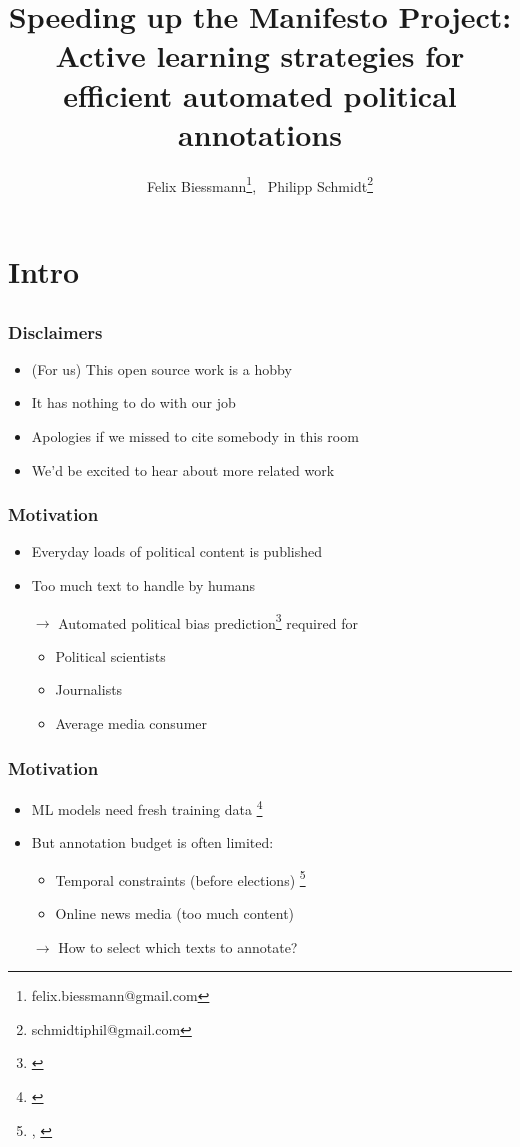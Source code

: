 \documentclass[]{beamer}
\institute[]{}
\title[Active Manifesto]{
{
Speeding up the Manifesto Project: \\ Active learning strategies for \\efficient automated political annotations
}}
\author{
Felix Biessmann\thanks{felix.biessmann@gmail.com},~ 
Philipp Schmidt\thanks{schmidtiphil@gmail.com}
}
\date{}
\begin{document}
\begin{frame} 
\titlepage 
\end{frame}	

%
\section{Intro}
\subsection{}

\begin{frame}\frametitle{Disclaimers}
\small
\begin{itemize}
\item (For us) This open source work is a hobby
\item It has nothing to do with our job
\item Apologies if we missed to cite somebody in this room
\item We'd be excited to hear about more related work
\end{itemize}
\end{frame}

\begin{frame}\frametitle{Motivation}
\begin{itemize}[<+->]
\item Everyday loads of political content is published
\item Too much text to handle by humans
\item[$\rightarrow$] Automated political bias prediction\footnote{\cite{Biessmann16, Merz2016}} required for 
\begin{itemize}
\item Political scientists
\item Journalists
\item Average media consumer
\end{itemize}
\end{itemize}
\end{frame}

\begin{frame}\frametitle{Motivation}
\begin{itemize}[<+->]
\item ML models need fresh training data \footnote{\cite{Biessmann16}}
\item But annotation budget is often limited:
\begin{itemize}
\item Temporal constraints (before elections) \footnote{\cite{merz2017}, \cite{bronline}}
\item Online news media (too much content) 
\end{itemize}
\item[$\rightarrow$] How to select which texts to annotate?
\end{itemize}
\end{frame}
\end{document}
